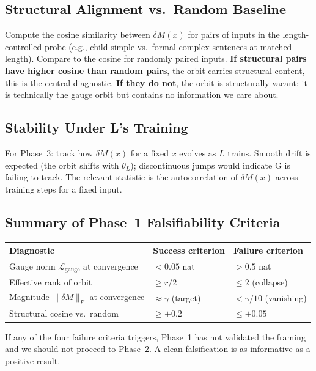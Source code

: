 \documentclass[11pt, a4paper]{article}
\theoremstyle{plain}
\theoremstyle{definition}
\theoremstyle{remark}
\begin{document}
\subsection{Structural Alignment vs.\ Random Baseline}

Compute the cosine similarity between $\delta M(x)$ for pairs of inputs in the length-controlled probe (e.g., child-simple vs.\ formal-complex sentences at matched length).
Compare to the cosine for randomly paired inputs.
\textbf{If structural pairs have higher cosine than random pairs}, the orbit carries structural content, this is the central diagnostic.
\textbf{If they do not}, the orbit is structurally vacant: it is technically the gauge orbit but contains no information we care about.

\subsection{Stability Under L's Training}

For Phase~3: track how $\delta M(x)$ for a fixed $x$ evolves as $L$ trains.
Smooth drift is expected (the orbit shifts with $\theta_{L}$); discontinuous jumps would indicate G is failing to track.
The relevant statistic is the autocorrelation of $\delta M(x)$ across training steps for a fixed input.

\subsection{Summary of Phase~1 Falsifiability Criteria}

\begin{center}
\begin{tabular}{l l l}
\toprule
Diagnostic & Success criterion & Failure criterion \\
\midrule
Gauge norm $\mathcal{L}_{\text{gauge}}$ at convergence & $< 0.05$ nat & $> 0.5$ nat \\
Effective rank of orbit & $\geq r/2$ & $\leq 2$ (collapse) \\
Magnitude $\|\delta M\|_{F}$ at convergence & $\approx \gamma$ (target) & $< \gamma / 10$ (vanishing) \\
Structural cosine vs.\ random & $\geq +0.2$ & $\leq +0.05$ \\
\bottomrule
\end{tabular}
\end{center}

If any of the four failure criteria triggers, Phase~1 has not validated the framing and we should not proceed to Phase~2.
A clean falsification is as informative as a positive result.
\end{document}
